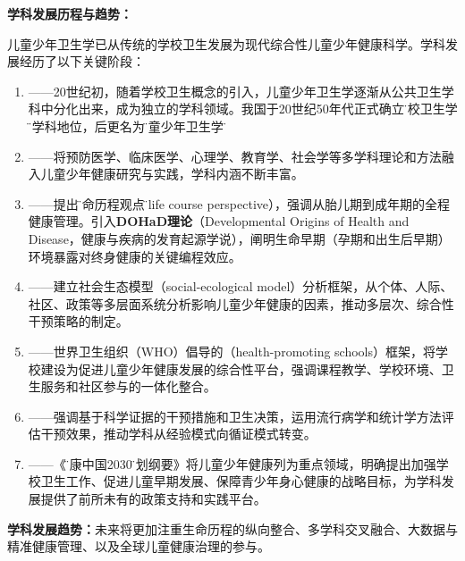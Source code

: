 \begin{tipbox}
\textbf{学科发展历程与趋势：}

儿童少年卫生学已从传统的学校卫生发展为现代综合性儿童少年健康科学。学科发展经历了以下关键阶段：

\begin{enumerate}[leftmargin=*]
    \item {}——20世纪初，随着学校卫生概念的引入，儿童少年卫生学逐渐从公共卫生学科中分化出来，成为独立的学科领域。我国于20世纪50年代正式确立\"学校卫生学\"的学科地位，后更名为\"儿童少年卫生学\"。

    \item {}——将预防医学、临床医学、心理学、教育学、社会学等多学科理论和方法融入儿童少年健康研究与实践，学科内涵不断丰富。

    \item {}——提出\"生命历程观点\"（life course perspective），强调从胎儿期到成年期的全程健康管理。引入\textbf{DOHaD理论}（Developmental Origins of Health and Disease，健康与疾病的发育起源学说），阐明生命早期（孕期和出生后早期）环境暴露对终身健康的关键编程效应。

    \item {}——建立社会生态模型（social-ecological model）分析框架，从个体、人际、社区、政策等多层面系统分析影响儿童少年健康的因素，推动多层次、综合性干预策略的制定。

    \item {}——世界卫生组织（WHO）倡导的（health-promoting schools）框架，将学校建设为促进儿童少年健康发展的综合性平台，强调课程教学、学校环境、卫生服务和社区参与的一体化整合。

    \item {}——强调基于科学证据的干预措施和卫生决策，运用流行病学和统计学方法评估干预效果，推动学科从经验模式向循证模式转变。

    \item {}——《\"健康中国2030\"规划纲要》将儿童少年健康列为重点领域，明确提出加强学校卫生工作、促进儿童早期发展、保障青少年身心健康的战略目标，为学科发展提供了前所未有的政策支持和实践平台。
\end{enumerate}

\textbf{学科发展趋势：}未来将更加注重生命历程的纵向整合、多学科交叉融合、大数据与精准健康管理、以及全球儿童健康治理的参与。
\end{tipbox}


